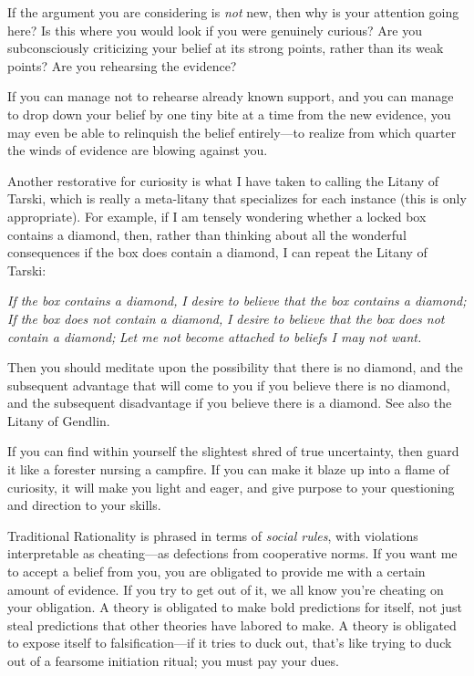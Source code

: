 {
 If the argument you are considering is \textit{not} new, then why
is your attention going here? Is this where you would look if you were
genuinely curious? Are you subconsciously criticizing your belief at
its strong points, rather than its weak points? Are you rehearsing the
evidence?}

{
 If you can manage not to rehearse already known support, and you
can manage to drop down your belief by one tiny bite at a time from the
new evidence, you may even be able to relinquish the belief
entirely---to realize from which quarter the winds of evidence are
blowing against you.}

{
 Another restorative for curiosity is what I have taken to calling
the Litany of Tarski, which is really a meta-litany that specializes
for each instance (this is only appropriate). For example, if I am
tensely wondering whether a locked box contains a diamond, then, rather
than thinking about all the wonderful consequences if the box does
contain a diamond, I can repeat the Litany of Tarski:}

{
 \textit{If the box contains a diamond,}\newline
\textit{ I desire to believe that the box contains a diamond;}\newline
\textit{ If the box does not contain a diamond,}\newline
\textit{ I desire to believe that the box does not contain a
diamond;}\newline
\textit{ Let me not become attached to beliefs I may not want.}}

{
 Then you should meditate upon the possibility that there is no
diamond, and the subsequent advantage that will come to you if you
believe there is no diamond, and the subsequent disadvantage if you
believe there is a diamond. See also the Litany of Gendlin.}

{
 If you can find within yourself the slightest shred of true
uncertainty, then guard it like a forester nursing a campfire. If you
can make it blaze up into a flame of curiosity, it will make you light
and eager, and give purpose to your questioning and direction to your
skills.}

\myendsectiontext


\bigskip


{
 Traditional Rationality is phrased in terms of \textit{social
rules}, with violations interpretable as cheating---as defections from
cooperative norms. If you want me to accept a belief from you, you are
obligated to provide me with a certain amount of evidence. If you try
to get out of it, we all know you're cheating on your
obligation. A theory is obligated to make bold predictions for itself,
not just steal predictions that other theories have labored to make. A
theory is obligated to expose itself to falsification---if it tries to
duck out, that's like trying to duck out of a fearsome
initiation ritual; you must pay your dues. }

